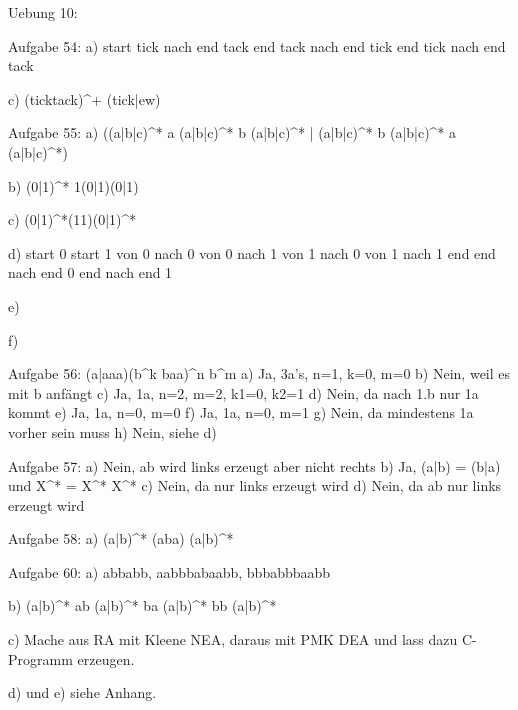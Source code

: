 Uebung 10:

Aufgabe 54:
a)
start tick nach end tack
end tack nach end tick
end tick nach end tack

c)
(ticktack)^+ (tick|ew)


Aufgabe 55:
a)
((a|b|c)^* a (a|b|c)^* b (a|b|c)^* |
(a|b|c)^* b (a|b|c)^* a (a|b|c)^*)

b)
(0|1)^* 1(0|1)(0|1)

c)
(0|1)^*(11)(0|1)^*

d)
start 0
start 1
von 0 nach 0
von 0 nach 1
von 1 nach 0
von 1 nach 1 end
end nach end 0
end nach end 1

e)

f)


Aufgabe 56:
(a|aaa)(b^k baa)^n b^m
a) Ja, 3a's, n=1, k=0, m=0
b) Nein, weil es mit b anfängt
c) Ja, 1a, n=2, m=2, k1=0, k2=1
d) Nein, da nach 1.b nur 1a kommt
e) Ja, 1a, n=0, m=0
f) Ja, 1a, n=0, m=1
g) Nein, da mindestens 1a vorher sein muss
h) Nein, siehe d)


Aufgabe 57:
a) Nein, ab wird links erzeugt aber nicht rechts
b) Ja, (a|b) = (b|a) und X^* = X^* X^*
c) Nein, da \epsilon nur links erzeugt wird
d) Nein, da ab nur links erzeugt wird


Aufgabe 58:
a) (a|b)^* (aba) (a|b)^*


Aufgabe 60:
a)
abbabb, aabbbabaabb, bbbabbbaabb

b)
(a|b)^* ab (a|b)^* ba (a|b)^* bb (a|b)^*

c)
Mache aus RA mit Kleene NEA, daraus mit PMK DEA und lass dazu C-Programm erzeugen.

d) und e) siehe Anhang.